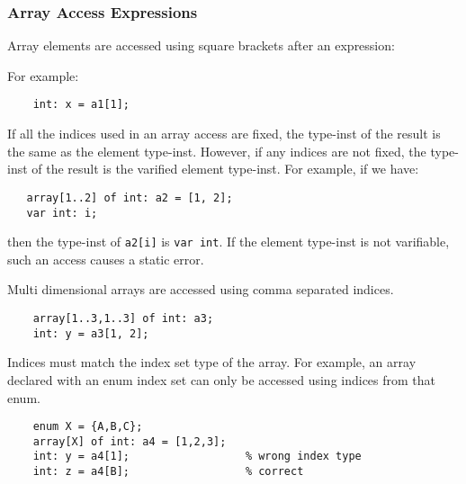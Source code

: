 \documentclass[10pt]{scrartcl}
\begin{document}
\subsubsection{Array Access Expressions}
        \label{Array Access Expressions}

Array elements are accessed using square brackets after an expression:
\begin{productions}
    \RuleArrayAccessTail
\end{productions}
For example:
\begin{verbatim}
    int: x = a1[1];
\end{verbatim}

If all the indices used in an array access are fixed, the type-inst of the
result is the same as the element type-inst.  However, if any
indices are not fixed, the type-inst of the result is the varified element
type-inst.  For example, if we have:
\begin{verbatim}
   array[1..2] of int: a2 = [1, 2];
   var int: i;
\end{verbatim}
then the type-inst of \texttt{a2[i]} is \texttt{var int}.  If the element type-inst
is not varifiable, such an access causes a static error.

Multi dimensional arrays 
are accessed using comma separated indices.
\begin{verbatim}
    array[1..3,1..3] of int: a3;
    int: y = a3[1, 2];
\end{verbatim}

Indices must match the index set type of the array. For example, an array declared with an enum index set can only be accessed using indices from that
enum.
\begin{verbatim}
    enum X = {A,B,C};
    array[X] of int: a4 = [1,2,3];
    int: y = a4[1];                  % wrong index type
    int: z = a4[B];                  % correct
\end{verbatim}

\end{document}
